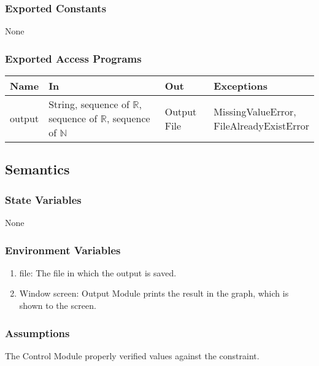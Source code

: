 \documentclass[12pt, titlepage]{article}
\begin{document}
\subsubsection{Exported Constants}
None 
\subsubsection{Exported Access Programs}


\begin{tabular}{p{2cm} p{5.5cm} p{3cm} p{3.5cm}}
\hline
\textbf{Name} & \textbf{In} & \textbf{Out} & \textbf{Exceptions} \\
\hline
output & \makecell[l]{String, \\ sequence of $\mathbb{R}$, \\ sequence of $\mathbb{R}$, \\ sequence of $\mathbb{N}$ } & Output File & \makecell[l]{MissingValueError, \\ FileAlreadyExistError} \\
\hline
\end{tabular}

\subsection{Semantics}

\subsubsection{State Variables}

None

\subsubsection{Environment Variables}

\begin{enumerate}
    \item file: The file in which the output is saved. 
    \item Window screen: Output Module prints the result in the graph, which is shown to the screen. 
\end{enumerate}


\subsubsection{Assumptions}

The Control Module properly verified values against the constraint.   
\end{document}

